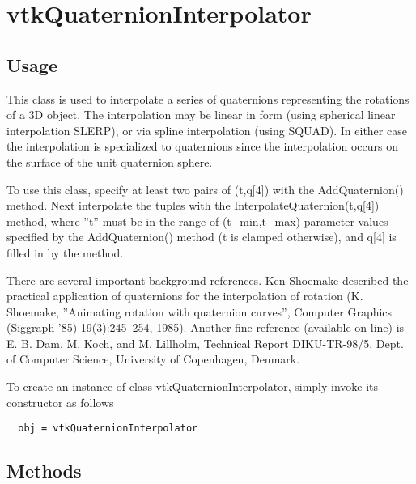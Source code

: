 \section{vtkQuaternionInterpolator}

\subsection{Usage}

 This class is used to interpolate a series of quaternions representing
 the rotations of a 3D object.  The interpolation may be linear in form
 (using spherical linear interpolation SLERP), or via spline interpolation
 (using SQUAD). In either case the interpolation is specialized to
 quaternions since the interpolation occurs on the surface of the unit
 quaternion sphere.

 To use this class, specify at least two pairs of (t,q[4]) with the
 AddQuaternion() method.  Next interpolate the tuples with the
 InterpolateQuaternion(t,q[4]) method, where ''t'' must be in the range of
 (t\_min,t\_max) parameter values specified by the AddQuaternion() method (t
 is clamped otherwise), and q[4] is filled in by the method. 

 There are several important background references. Ken Shoemake described
 the practical application of quaternions for the interpolation of rotation
 (K. Shoemake, ''Animating rotation with quaternion curves'', Computer
 Graphics (Siggraph '85) 19(3):245--254, 1985). Another fine reference
 (available on-line) is E. B. Dam, M. Koch, and M. Lillholm, Technical
 Report DIKU-TR-98/5, Dept. of Computer Science, University of Copenhagen,
 Denmark.


To create an instance of class vtkQuaternionInterpolator, simply
invoke its constructor as follows
\begin{verbatim}
  obj = vtkQuaternionInterpolator
\end{verbatim}
\subsection{Methods}

